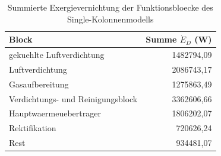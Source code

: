 \begin{longtable}{lr}
\caption{Summierte Exergievernichtung der Funktionsbloecke des Single-Kolonnenmodells} \\
\hline
Block & Summe $\dot{E}_D$ (W) \\
\hline
gekuehlte Luftverdichtung & 1482794,09 \\
Luftverdichtung & 2086743,17 \\
Gasaufbereitung & 1275863,49 \\
Verdichtungs- und Reinigungsblock & 3362606,66 \\
Hauptwaermeuebertrager & 1806202,07 \\
Rektifikation & 720626,24 \\
Rest & 934481,07 \\
\hline
\end{longtable}